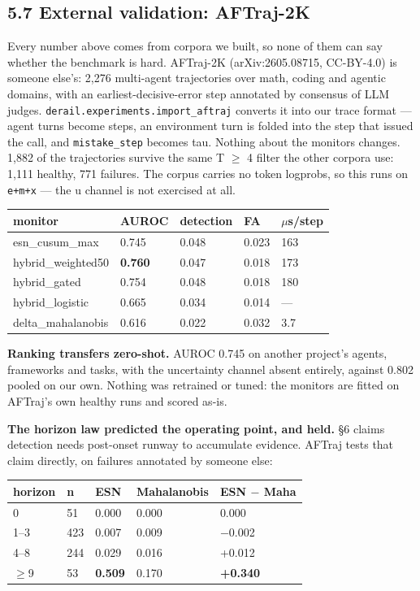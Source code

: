 \documentclass[11pt]{article}
\begin{document}
\subsection{5.7 External validation: AFTraj-2K}


Every number above comes from corpora we built, so none of them can say whether the benchmark is hard. AFTraj-2K (arXiv:2605.08715, CC-BY-4.0) is someone else's: 2,276 multi-agent trajectories over math, coding and agentic domains, with an earliest-decisive-error step annotated by consensus of LLM judges. \texttt{derail.experiments.import\_\allowbreak{}aftraj} converts it into our trace format --- agent turns become steps, an environment turn is folded into the step that issued the call, and \texttt{mistake\_\allowbreak{}step} becomes tau. Nothing about the monitors changes. 1,882 of the trajectories survive the same T $\geq$ 4 filter the other corpora use: 1,111 healthy, 771 failures. The corpus carries no token logprobs, so this runs on \texttt{e+m+x} --- the u channel is not exercised at all.


\begin{longtable}{lllll}
\toprule
\textbf{monitor} & \textbf{AUROC} & \textbf{detection} & \textbf{FA} & \textbf{$\mu$s/step} \\
\midrule
\endhead
esn\_cusum\_max & 0.745 & 0.048 & 0.023 & 163 \\
hybrid\_weighted50 & \textbf{0.760} & 0.047 & 0.018 & 173 \\
hybrid\_gated & 0.754 & 0.048 & 0.018 & 180 \\
hybrid\_logistic & 0.665 & 0.034 & 0.014 & --- \\
delta\_mahalanobis & 0.616 & 0.022 & 0.032 & 3.7 \\
\bottomrule
\end{longtable}


\textbf{Ranking transfers zero-shot.} AUROC 0.745 on another project's agents, frameworks and tasks, with the uncertainty channel absent entirely, against 0.802 pooled on our own. Nothing was retrained or tuned: the monitors are fitted on AFTraj's own healthy runs and scored as-is.


\textbf{The horizon law predicted the operating point, and held.} \S{}6 claims detection needs post-onset runway to accumulate evidence. AFTraj tests that claim directly, on failures annotated by someone else:


\begin{longtable}{lllll}
\toprule
\textbf{horizon} & \textbf{n} & \textbf{ESN} & \textbf{Mahalanobis} & \textbf{ESN $-$ Maha} \\
\midrule
\endhead
0 & 51 & 0.000 & 0.000 & 0.000 \\
1--3 & 423 & 0.007 & 0.009 & $-$0.002 \\
4--8 & 244 & 0.029 & 0.016 & +0.012 \\
$\geq$9 & 53 & \textbf{0.509} & 0.170 & \textbf{+0.340} \\
\bottomrule
\end{longtable}
\end{document}
